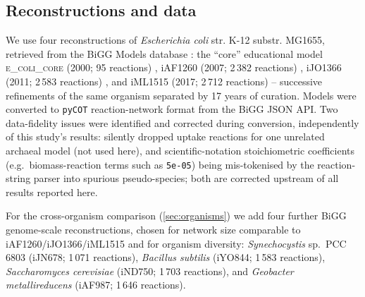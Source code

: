 \documentclass[nocrop]{bioinfo}
\begin{document}
\subsection{Reconstructions and data}
We use four reconstructions of \textit{Escherichia coli} str. K-12 substr. MG1655, retrieved
from the BiGG Models database \citep{king2016bigg}: the ``core'' educational model
\textsc{e\_coli\_core} (2000; 95 reactions) \citep{orth2010core}, iAF1260 (2007; 2\,382
reactions) \citep{feist2007iaf1260}, iJO1366 (2011; 2\,583 reactions)
\citep{orth2011comprehensive}, and iML1515 (2017; 2\,712 reactions) \citep{monk2017iml1515} --
successive refinements of the same organism separated by 17 years of curation. Models were
converted to \texttt{pyCOT} reaction-network format from the BiGG JSON API. Two data-fidelity
issues were identified and corrected during conversion, independently of this study's results:
silently dropped uptake reactions for one unrelated archaeal model (not used here), and
scientific-notation stoichiometric coefficients (e.g.\ biomass-reaction terms such as
\texttt{5e-05}) being mis-tokenised by the reaction-string parser into spurious pseudo-species;
both are corrected upstream of all results reported here.

For the cross-organism comparison (\cref{sec:organisms}) we add four further BiGG genome-scale
reconstructions, chosen for network size comparable to iAF1260/iJO1366/iML1515 and for
organism diversity: \textit{Synechocystis} sp.\ PCC 6803 (iJN678; 1\,071 reactions),
\textit{Bacillus subtilis} (iYO844; 1\,583 reactions), \textit{Saccharomyces cerevisiae}
(iND750; 1\,703 reactions), and \textit{Geobacter metallireducens} (iAF987; 1\,646 reactions).
\end{document}
